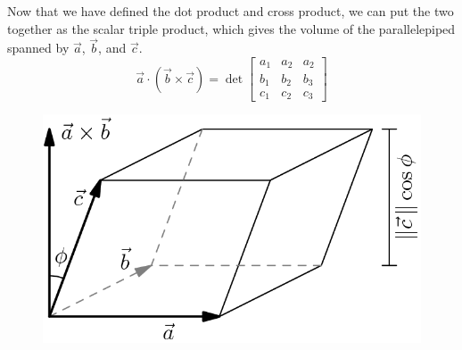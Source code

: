 


\noindent
Now that we have defined the dot product and cross product, we can put the two together as the scalar triple product, which gives the volume of the parallelepiped spanned by $\vec{a}$, $\vec{b}$, and $\vec{c}$.\\
\begin{equation*}
	\vec{a}\cdot\left(\vec{b}\times\vec{c}\right) = \det\begin{bmatrix}
		a_1 & a_2 & a_2 \\
		b_1 & b_2 & b_3 \\
		c_1 & c_2 & c_3
	\end{bmatrix}
\end{equation*}

\begin{figure}[h]
	\centering
	\includegraphics[scale=0.33]{Images/backgroundReview/Parallelipiped}
\end{figure}
